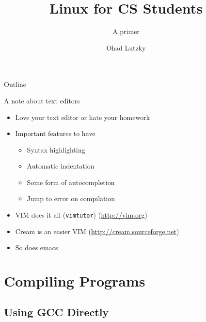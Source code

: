 \documentclass{beamer}
\title[Linux CS Primer] {Linux for CS Students}
\subtitle {A primer}
\author{Ohad Lutzky}
\institute
{
Department of Computer Science\\
Technion IIT
}
\begin{document}
\begin{frame}
  \titlepage
\end{frame}

\begin{frame}{Outline}
  \tableofcontents
\end{frame}



\begin{frame}{A note about text editors}
  \begin{itemize}
    \item Love your text editor or hate your homework
    \item Important features to have
      \pause
      \begin{itemize}
        \item Syntax highlighting \pause
        \item Automatic indentation \pause
        \item Some form of autocompletion \pause
        \item Jump to error on compilation
      \end{itemize}
      \pause
    \item VIM does it all (\texttt{vimtutor})
      (\href{http://vim.org}{http://vim.org})
    \item Cream is an easier VIM
      (\href{http://cream.sourceforge.net}{http://cream.sourceforge.net})
      \pause
    \item So does emacs
  \end{itemize}
\end{frame}

\section{Compiling Programs}

\subsection{Using GCC Directly}
\end{document}
